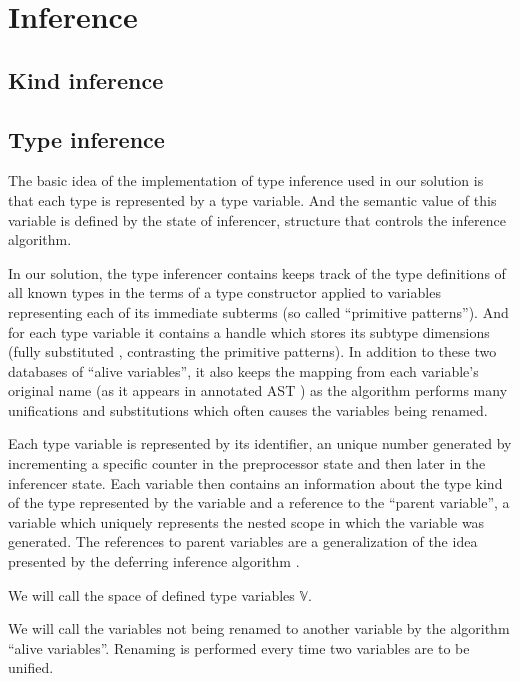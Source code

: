 \section{Inference}



\subsection{Kind inference}


\subsection{Type inference}

The basic idea of the implementation of type inference used in our solution is that each type is represented by a type variable. And the semantic value of this variable is defined by the state of inferencer, structure that controls the inference algorithm.

In our solution, the type inferencer contains keeps track of the type definitions of all known types in the terms of a type constructor applied to variables representing each of its immediate subterms (so called ``primitive patterns''). And for each type variable it contains a handle which stores its subtype dimensions (fully substituted , contrasting the primitive patterns). In addition to these two databases of ``alive variables'', it also keeps the mapping from each variable's original name (as it appears in annotated AST ) as the algorithm performs many unifications and substitutions which often causes the variables being renamed.

\begin{defn}
    Each type variable is represented by its identifier, an unique number generated by incrementing a specific counter in the preprocessor state  and then later in the inferencer state. Each variable then contains an information about the type kind of the type represented by the variable  and a reference to the ``parent variable'', a variable which uniquely represents the nested scope in which the variable was generated. The references to parent variables are a generalization of the idea presented by the deferring inference algorithm  .

    We will call the space of defined type variables $\mathbb{V}$.

    We will call the variables not being renamed to another variable by the algorithm ``alive variables''. Renaming is performed every time two variables are to be unified.
\end{defn}

